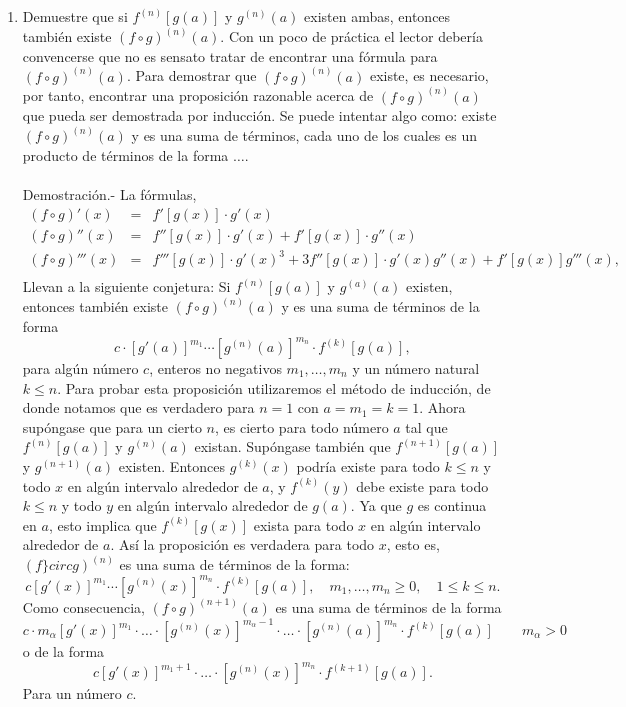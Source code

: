 \begin{enumerate}[\bfseries 1.]
     \item Demuestre que si $f^{(n)}\left[g(a)\right]$ y $g^{(n)}(a)$ existen ambas, entonces también existe $(f\circ g)^{(n)}(a)$. Con un poco de práctica el lector debería convencerse que no es sensato tratar de encontrar una fórmula para $(f \circ g)^{(n)}(a)$. Para demostrar que $(f \circ g)^{(n)}(a)$ existe, es necesario, por tanto, encontrar una proposición razonable acerca de $(f \circ g)^{(n)}(a)$ que pueda ser demostrada por inducción. Se puede intentar algo como: existe $(f \circ g)^{(n)}(a)$ y es una suma de términos, cada uno de los cuales es un producto de términos de la forma $\ldots$.\\\\ 
	 Demostración.-\; La fórmulas,
	 $$\begin{array}{rcl}
	     (f\circ g)'(x) &=& f'\left[g(x)\right]\cdot g'(x)\\
	     (f\circ g)''(x) &=& f''\left[g(x)\right] \cdot g'(x) + f'\left[g(x)\right]\cdot g''(x)\\
	     (f\circ g)'''(x) &=& f'''\left[g(x)\right]\cdot g'(x)^3 + 3f''\left[g(x)\right]\cdot g'(x)g''(x)+f'\left[g(x)\right]g'''(x),\\
	 \end{array}$$
	 Llevan a la siguiente conjetura: Si $f^{(n)}\left[g(a)\right]$ y $g^{(a)}(a)$ existen, entonces también existe $(f\circ g)^{(n)}(a)$ y es una suma de términos de la forma
	 $$c\cdot \left[g'(a)\right]^{m_1}\cdots \left[g^{(n)}(a)\right]^{m_n}\cdot f^{(k)}\left[g(a)\right],$$
	 para algún número $c$, enteros no negativos $m_1,\ldots , m_n$ y un número natural $k\leq n$. Para probar esta proposición utilizaremos el método de inducción, de donde notamos que es verdadero para $n=1$ con $a=m_1=k=1$. Ahora supóngase que para un cierto $n$, es cierto para todo número $a$ tal que $f^{(n)}\left[g(a)\right]$ y $g^{(n)}(a)$ existan. Supóngase también que $f^{(n+1)}\left[g(a)\right]$ y $g^{(n+1)}(a)$ existen. Entonces $g^{(k)}(x)$ podría existe para todo $k\leq n$ y todo $x$ en algún intervalo alrededor de $a$, y $f^{(k)}(y)$  debe existe para todo $k\leq n$ y todo $y$ en algún intervalo alrededor de $g(a)$. Ya que $g$ es continua en $a$, esto implica que $f^{(k)}\left[g(x)\right]$ exista para todo $x$ en algún intervalo alrededor de $a$. Así la proposición es verdadera para todo $x$, esto es, $(f\}circ g)^{(n)}$ es una suma de términos de la forma:
	 $$c\left[g'(x)\right]^{m_1}\cdots \left[g^{(n)}(x)\right]^{m_n}\cdot f^{(k)}\left[g(a)\right],\quad m_1,\ldots, m_n \geq 0,\quad 1\leq k \leq n.$$
	 Como consecuencia, $(f\circ g)^{(n+1)}(a)$ es una suma de términos de la forma
	 $$c\cdot m_\alpha \left[g'(x)\right]^{m_1}\cdot \ldots \cdot\left[g^{(n)}(x)\right]^{m_\alpha - 1}\cdot \ldots \cdot\left[g^{(n)}(a)\right]^{m_n}\cdot f^{(k)}\left[g(a)\right]\qquad m_\alpha>0$$
	 o de la forma
	 $$c\left[g'(x)\right]^{m_1+1} \cdot \ldots \cdot\left[g^{(n)}(x)\right]^{m_n}\cdot f^{(k+1)}\left[g(a)\right].$$
	 Para un número $c$.\\\\


\end{enumerate}
